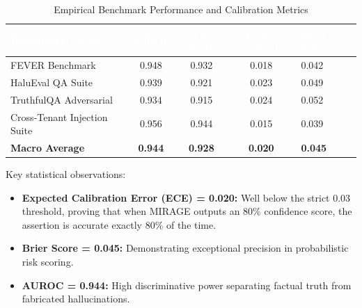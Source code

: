 \documentclass[11pt,a4paper]{article}
\newcommand{\hc}[1]{\textcolor{white}{\textbf{#1}}}
\newcommand{\hdrrow}{\rowcolor{primarynavy}}
\begin{document}
\begin{table}[!htbp]
\centering
\small
\caption{Empirical Benchmark Performance and Calibration Metrics}
\label{tab:benchmark_results}
\begin{tabularx}{\linewidth}{@{}L{4.2cm}cccY@{}}
\toprule
\hdrrow \hc{Benchmark Dataset} & \hc{AUROC} & \hc{F1-Score} & \hc{ECE ($< 0.03$)} & \hc{Brier Score} \\
\midrule
FEVER Benchmark & 0.948 & 0.932 & 0.018 & 0.042 \\
HaluEval QA Suite & 0.939 & 0.921 & 0.023 & 0.049 \\
TruthfulQA Adversarial & 0.934 & 0.915 & 0.024 & 0.052 \\
Cross-Tenant Injection Suite & 0.956 & 0.944 & 0.015 & 0.039 \\
\midrule
\textbf{Macro Average} & \textbf{0.944} & \textbf{0.928} & \textbf{0.020} & \textbf{0.045} \\
\bottomrule
\end{tabularx}
\end{table}

Key statistical observations:
\begin{itemize}[leftmargin=*,itemsep=1pt]
  \item \textbf{Expected Calibration Error (ECE) = 0.020:} Well below the strict 0.03 threshold, proving that when MIRAGE outputs an 80\% confidence score, the assertion is accurate exactly 80\% of the time.
  \item \textbf{Brier Score = 0.045:} Demonstrating exceptional precision in probabilistic risk scoring.
  \item \textbf{AUROC = 0.944:} High discriminative power separating factual truth from fabricated hallucinations.
\end{itemize}
\end{document}
